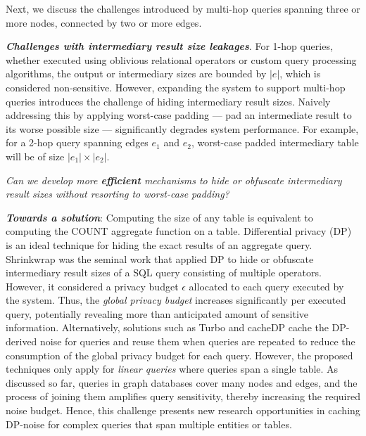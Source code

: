 Next, we discuss the challenges introduced by multi-hop queries
spanning three or more nodes, connected by two or more
edges.

\noindent\textit{\textbf{Challenges with intermediary result size leakages}}. For
1-hop queries, whether executed using oblivious relational operators or custom query 
processing algorithms, the output or intermediary sizes are bounded by $|e|$, which
is considered non-sensitive. However, expanding the system to support
multi-hop queries introduces the challenge of hiding intermediary result sizes.
Naively addressing this by applying worst-case padding — pad an intermediate result to its worse possible size — significantly degrades system performance. 
For example,
for a 2-hop query spanning edges $e_1$ and $e_2$, worst-case padded intermediary table
will be of size $|e_1| \times |e_2|$.


\begin{tcolorbox}[colback=gray!7!white,coltitle=black,colframe=orange!50!white,title=\centering \textbf{Research question 3}]
\centering
\emph{Can we develop more \textbf{efficient} mechanisms to hide or obfuscate intermediary result sizes without resorting to worst-case padding?}
\end{tcolorbox}

\noindent\textit{\textbf{Towards a solution}}: Computing the size of any table is 
equivalent to computing the COUNT aggregate function on a table. Differential privacy (DP) \cite{DworkRoth2014} is an ideal technique for hiding the exact results of an aggregate query. Shrinkwrap \cite{Bater2018} was
the seminal work that applied DP to hide or obfuscate intermediary result sizes of
a SQL query consisting of multiple operators. However, it considered a privacy budget
$\epsilon$ allocated to each query executed by the system. Thus, the \textit{global 
privacy budget} increases significantly per executed query, potentially revealing more
than anticipated amount of sensitive information. Alternatively, solutions such as 
Turbo \cite{Kostopoulou2023} and cacheDP \cite{Mazmudar2022} cache the DP-derived noise for queries and reuse them when queries
are repeated to reduce the consumption of the global privacy budget for each query. 
However, the proposed techniques only apply for \textit{linear queries} where queries 
span a single table. As discussed so far, queries in graph databases cover many nodes
and edges, and the process of joining them amplifies query sensitivity, thereby increasing 
the required noise budget. Hence, this challenge presents new research opportunities in 
caching DP-noise for complex queries that span multiple entities or tables.


